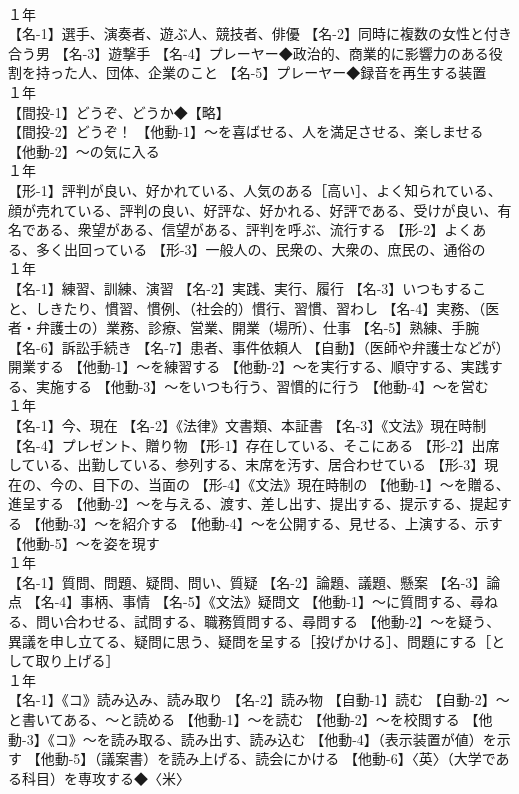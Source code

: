 \documentclass[8pt]{extreport}
\begin{document}
\begin{CJK}{UTF8}{min}
\\	１年	
\\	【名-1】選手、演奏者、遊ぶ人、競技者、俳優 【名-2】同時に複数の女性と付き合う男 【名-3】遊撃手 【名-4】プレーヤー◆政治的、商業的に影響力のある役割を持った人、団体、企業のこと 【名-5】プレーヤー◆録音を再生する装置
\\	１年	
\\	【間投-1】どうぞ、どうか◆【略】
\\	【間投-2】どうぞ！ 【他動-1】～を喜ばせる、人を満足させる、楽しませる 【他動-2】～の気に入る
\\	１年	
\\	【形-1】評判が良い、好かれている、人気のある［高い］、よく知られている、顔が売れている、評判の良い、好評な、好かれる、好評である、受けが良い、有名である、衆望がある、信望がある、評判を呼ぶ、流行する 【形-2】よくある、多く出回っている 【形-3】一般人の、民衆の、大衆の、庶民の、通俗の
\\	１年	
\\	【名-1】練習、訓練、演習 【名-2】実践、実行、履行 【名-3】いつもすること、しきたり、慣習、慣例、（社会的）慣行、習慣、習わし 【名-4】実務、（医者・弁護士の）業務、診療、営業、開業（場所）、仕事 【名-5】熟練、手腕 【名-6】訴訟手続き 【名-7】患者、事件依頼人 【自動】（医師や弁護士などが）開業する 【他動-1】～を練習する 【他動-2】～を実行する、順守する、実践する、実施する 【他動-3】～をいつも行う、習慣的に行う 【他動-4】～を営む
\\	１年	
\\	【名-1】今、現在 【名-2】《法律》文書類、本証書 【名-3】《文法》現在時制 【名-4】プレゼント、贈り物 【形-1】存在している、そこにある 【形-2】出席している、出勤している、参列する、末席を汚す、居合わせている 【形-3】現在の、今の、目下の、当面の 【形-4】《文法》現在時制の 【他動-1】～を贈る、進呈する 【他動-2】～を与える、渡す、差し出す、提出する、提示する、提起する 【他動-3】～を紹介する 【他動-4】～を公開する、見せる、上演する、示す 【他動-5】～を姿を現す
\\	１年	
\\	【名-1】質問、問題、疑問、問い、質疑 【名-2】論題、議題、懸案 【名-3】論点 【名-4】事柄、事情 【名-5】《文法》疑問文 【他動-1】～に質問する、尋ねる、問い合わせる、試問する、職務質問する、尋問する 【他動-2】～を疑う、異議を申し立てる、疑問に思う、疑問を呈する［投げかける］、問題にする［として取り上げる］
\\	１年	
\\	【名-1】《コ》読み込み、読み取り 【名-2】読み物 【自動-1】読む 【自動-2】～と書いてある、～と読める 【他動-1】～を読む 【他動-2】～を校閲する 【他動-3】《コ》～を読み取る、読み出す、読み込む 【他動-4】（表示装置が値）を示す 【他動-5】（議案書）を読み上げる、読会にかける 【他動-6】〈英〉（大学である科目）を専攻する◆〈米〉

\end{CJK}
\end{document}
